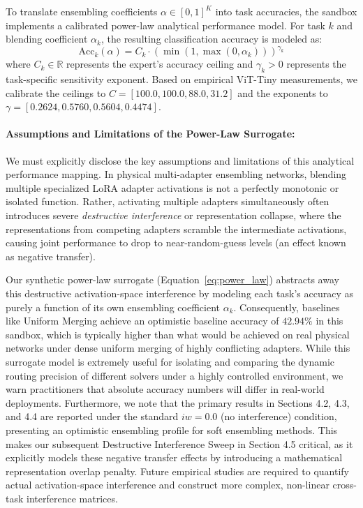 To translate ensembling coefficients $\alpha \in [0, 1]^K$ into task accuracies, the sandbox implements a calibrated power-law analytical performance model. For task $k$ and blending coefficient $\alpha_k$, the resulting classification accuracy is modeled as:
\begin{equation}
    \label{eq:power_law}
    \text{Acc}_k(\alpha) = C_k \cdot \left(\min(1, \max(0, \alpha_k))\right)^{\gamma_k}
\end{equation}
where $C_k \in \mathbb{R}$ represents the expert's accuracy ceiling and $\gamma_k > 0$ represents the task-specific sensitivity exponent. Based on empirical ViT-Tiny measurements, we calibrate the ceilings to $C = [100.0, 100.0, 88.0, 31.2]$ and the exponents to $\gamma = [0.2624, 0.5760, 0.5604, 0.4474]$.

\paragraph{Assumptions and Limitations of the Power-Law Surrogate:} We must explicitly disclose the key assumptions and limitations of this analytical performance mapping. In physical multi-adapter ensembling networks, blending multiple specialized LoRA adapter activations is not a perfectly monotonic or isolated function. Rather, activating multiple adapters simultaneously often introduces severe \emph{destructive interference} or representation collapse, where the representations from competing adapters scramble the intermediate activations, causing joint performance to drop to near-random-guess levels (an effect known as negative transfer). 

Our synthetic power-law surrogate (Equation~\ref{eq:power_law}) abstracts away this destructive activation-space interference by modeling each task's accuracy as purely a function of its own ensembling coefficient $\alpha_k$. Consequently, baselines like Uniform Merging achieve an optimistic baseline accuracy of $42.94\%$ in this sandbox, which is typically higher than what would be achieved on real physical networks under dense uniform merging of highly conflicting adapters. While this surrogate model is extremely useful for isolating and comparing the dynamic routing precision of different solvers under a highly controlled environment, we warn practitioners that absolute accuracy numbers will differ in real-world deployments. Furthermore, we note that the primary results in Sections 4.2, 4.3, and 4.4 are reported under the standard $iw=0.0$ (no interference) condition, presenting an optimistic ensembling profile for soft ensembling methods. This makes our subsequent Destructive Interference Sweep in Section 4.5 critical, as it explicitly models these negative transfer effects by introducing a mathematical representation overlap penalty. Future empirical studies are required to quantify actual activation-space interference and construct more complex, non-linear cross-task interference matrices.

